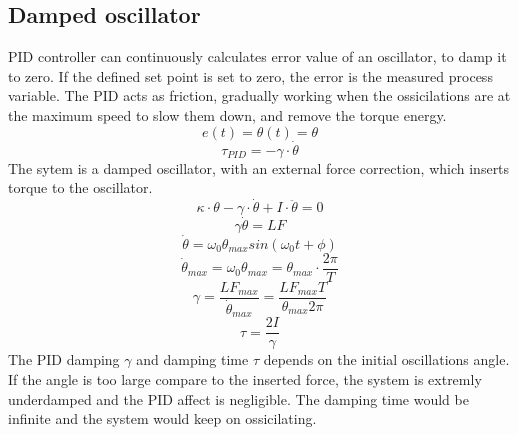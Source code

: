 \documentclass[\main/master.tex]{subfiles}
\begin{document}
\subsection{Damped oscillator}
PID controller can continuously calculates error value of an oscillator, to damp it to zero. If the defined set point is set to zero, the error is the measured process variable. The PID acts as friction, gradually working when the ossicilations are at the maximum speed to slow them down, and remove the torque energy.
\begin{equation}
e(t) = \theta(t) = \theta   \label{eqn:error}
\end{equation}
\begin{equation}
\tau_{PID} = -\gamma\cdot\dot{\theta}   \label{eqn:friction_torque}
\end{equation}
The sytem is a damped oscillator, with an external force correction, which inserts torque to the oscillator.
\begin{equation}
\kappa\cdot\theta - \gamma\cdot\dot{\theta}  + I\cdot\ddot{\theta} = 0   \label{eqn:damped__pid_motion_equation}
\end{equation}
\begin{equation}
\gamma\dot{\theta}  = LF   \label{eqn:damped__pid_motion_equation}
\end{equation}
\begin{equation}
\dot{\theta} = \omega_0\theta_{max}sin(\omega_0 t +\phi)    \label{eqn:undamped_motion_equation}
\end{equation}
\begin{equation}
\dot{\theta}_{max} = \omega_0\theta_{max} = \theta_{max}\cdot\frac{2\pi}{T}    \label{eqn:undamped_motion_equation}
\end{equation}
\begin{equation}
\gamma  = \frac{LF_{max}}{\dot{\theta}_{max}} =\frac{LF_{max}T}{\theta_{max}2\pi}    \label{eqn:damped_pid_motion_equation}
\end{equation}
\begin{equation}
\tau =  \frac{2I}{\gamma}  \label{eqn:damping_time}
\end{equation}
The PID damping $\gamma$ and damping time $\tau$ depends on the initial oscillations angle. If the angle is too large compare to the inserted force, the system is extremly underdamped and the PID affect is negligible. The damping time would be infinite and the system would keep on ossicilating.
\end{document}
